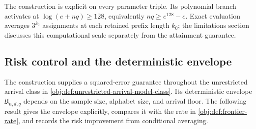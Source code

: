 The construction is explicit on every parameter triple. Its polynomial branch activates at \(\log(e+nq)\ge128\), equivalently \(nq\ge e^{128}-e\). Exact evaluation averages \(3^{k_0}\) assignments at each retained prefix length \(k_0\); the limitations section discusses this computational scale separately from the attainment guarantee.

\subsection{Risk control and the deterministic envelope}

The construction supplies a squared-error guarantee throughout the unrestricted arrival class in \cref{obj:def:unrestricted-arrival-model-class}. Its deterministic envelope \(\mathfrak U_{n,d,q}\) depends on the sample size, alphabet size, and arrival floor. The following result gives the envelope explicitly, compares it with the rate in \cref{obj:def:frontier-rate}, and records the risk improvement from conditional averaging.

